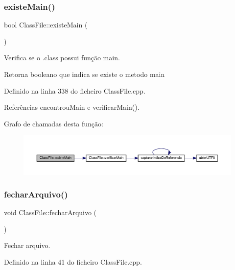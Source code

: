 \subsubsection{\texorpdfstring{existe\+Main()}{existeMain()}}
{\footnotesize\ttfamily bool Class\+File\+::existe\+Main (\begin{DoxyParamCaption}{ }\end{DoxyParamCaption})}



Verifica se o .class possui função main. 

\begin{DoxyReturn}{Retorna}
booleano que indica se existe o metodo main 
\end{DoxyReturn}


Definido na linha 338 do ficheiro Class\+File.\+cpp.



Referências encontrou\+Main e verificar\+Main().

Grafo de chamadas desta função\+:\nopagebreak
\begin{figure}[H]
\begin{center}
\leavevmode
\includegraphics[width=350pt]{classClassFile_a10bfe22492b473fb0197e55f451978e5_cgraph}
\end{center}
\end{figure}
\mbox{\label{classClassFile_a581c453009afcb8b7a2861a2de8cfb5c}} 
\subsubsection{\texorpdfstring{fechar\+Arquivo()}{fecharArquivo()}}
{\footnotesize\ttfamily void Class\+File\+::fechar\+Arquivo (\begin{DoxyParamCaption}{ }\end{DoxyParamCaption})}



Fechar arquivo. 



Definido na linha 41 do ficheiro Class\+File.\+cpp.



